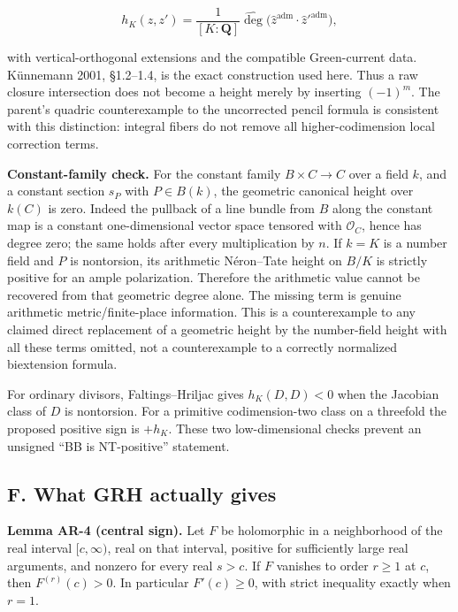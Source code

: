 \[
h_K(z,z')=\frac1{[K:\mathbf Q]}\widehat{\deg}
 \bigl(\widehat z^{\mathrm{adm}}\cdot\widehat z'^{\mathrm{adm}}\bigr),
\tag{AR.6}
\]

with vertical-orthogonal extensions and the compatible Green-current
data. Künnemann 2001, §1.2--1.4, is the exact construction used here.
Thus a raw closure intersection does not become a height merely by
inserting \((-1)^m\). The parent's quadric counterexample to the
uncorrected pencil formula is consistent with this distinction: integral
fibers do not remove all higher-codimension local correction terms.

\textbf{Constant-family check.} For the constant family
\(B\times C\to C\) over a field \(k\), and a constant section \(s_P\)
with \(P\in B(k)\), the geometric canonical height over \(k(C)\) is
zero. Indeed the pullback of a line bundle from \(B\) along the constant
map is a constant one-dimensional vector space tensored with
\(\mathcal O_C\), hence has degree zero; the same holds after every
multiplication by \(n\). If \(k=K\) is a number field and \(P\) is
nontorsion, its arithmetic Néron--Tate height on \(B/K\) is strictly
positive for an ample polarization. Therefore the arithmetic value
cannot be recovered from that geometric degree alone. The missing term
is genuine arithmetic metric/finite-place information. This is a
counterexample to any claimed direct replacement of a geometric height
by the number-field height with all these terms omitted, not a
counterexample to a correctly normalized biextension formula.

For ordinary divisors, Faltings--Hriljac gives \(h_K(D,D)<0\) when the
Jacobian class of \(D\) is nontorsion. For a primitive codimension-two
class on a threefold the proposed positive sign is \(+h_K\). These two
low-dimensional checks prevent an unsigned ``BB is NT-positive''
statement.

\subsection{F. What GRH actually
gives}\label{f.-what-grh-actually-gives}

\textbf{Lemma AR-4 (central sign).} Let \(F\) be holomorphic in a
neighborhood of the real interval \([c,\infty)\), real on that interval,
positive for sufficiently large real arguments, and nonzero for every
real \(s>c\). If \(F\) vanishes to order \(r\ge1\) at \(c\), then
\(F^{(r)}(c)>0\). In particular \(F'(c)\ge0\), with strict inequality
exactly when \(r=1\).

